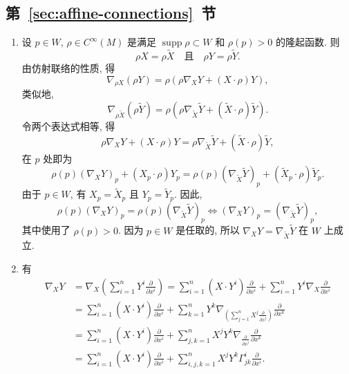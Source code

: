 \subsection{\texorpdfstring{第~\ref{sec:affine-connections}~节}{仿射联络}}\label{subsec:solutions-affine-connections}

\begin{description}[font=\normalfont,leftmargin=2em,labelwidth=1.5em]
\begin{enumerate}[label=(\alph*),ref=\alph*,leftmargin=*]
\item 设 $p\in W$, $\rho\in C^\infty(M)$ 是满足 $\operatorname{supp}\rho\subset W$ 和 $\rho(p)>0$ 的隆起函数. 则
\[
  \rho X=\rho\widetilde X\quad\text{且}\quad \rho Y=\rho\widetilde Y.
\]
由仿射联络的性质, 得
\[
  \nabla_{\rho X}(\rho Y)=\rho(\rho\nabla_XY+(X\cdot\rho)Y),
\]
类似地,
\[
  \nabla_{\rho\widetilde X}(\rho\widetilde Y)
  =\rho(\rho\nabla_{\widetilde X}\widetilde Y+(\widetilde X\cdot\rho)\widetilde Y).
\]
令两个表达式相等, 得
\[
  \rho\nabla_XY+(X\cdot\rho)Y
  =\rho\nabla_{\widetilde X}\widetilde Y+(\widetilde X\cdot\rho)\widetilde Y,
\]
在 $p$ 处即为
\[
  \rho(p)(\nabla_XY)_p+(X_p\cdot\rho)Y_p
  =\rho(p)(\nabla_{\widetilde X}\widetilde Y)_p+(\widetilde X_p\cdot\rho)\widetilde Y_p.
\]
由于 $p\in W$, 有 $X_p=\widetilde X_p$ 且 $Y_p=\widetilde Y_p$. 因此,
\[
  \rho(p)(\nabla_XY)_p=\rho(p)(\nabla_{\widetilde X}\widetilde Y)_p
  \iff(\nabla_XY)_p=(\nabla_{\widetilde X}\widetilde Y)_p,
\]
其中使用了 $\rho(p)>0$. 因为 $p\in W$ 是任取的, 所以 $\nabla_XY=\nabla_{\widetilde X}\widetilde Y$ 在 $W$ 上成立.
\item 有
\begin{align*}
  \nabla_XY&=\nabla_X\left(\sum_{i=1}^nY^i\frac{\partial}{\partial x^i}\right)
  =\sum_{i=1}^n(X\cdot Y^i)\frac{\partial}{\partial x^i}
  +\sum_{i=1}^nY^i\nabla_X\frac{\partial}{\partial x^i}\\
  &=\sum_{i=1}^n(X\cdot Y^i)\frac{\partial}{\partial x^i}
  +\sum_{k=1}^nY^k\nabla_{\left(\sum_{j=1}^n X^j\frac{\partial}{\partial x^j}\right)}
       \frac{\partial}{\partial x^k}\\
  &=\sum_{i=1}^n(X\cdot Y^i)\frac{\partial}{\partial x^i}
  +\sum_{j,k=1}^nX^jY^k\nabla_{\frac{\partial}{\partial x^j}}\frac{\partial}{\partial x^k}\\
  &=\sum_{i=1}^n(X\cdot Y^i)\frac{\partial}{\partial x^i}
  +\sum_{i,j,k=1}^nX^jY^k\Gamma^i_{jk}\frac{\partial}{\partial x^i}.
\end{align*}

\end{enumerate}
\end{description}
